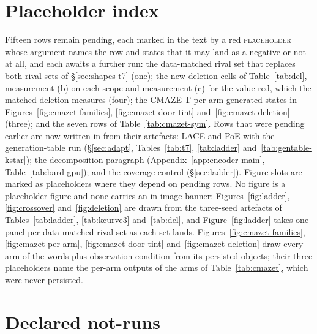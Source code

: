 \documentclass{article} %
\begin{document}
\section{Placeholder index}
\label{app:placeholders}

Fifteen rows remain pending, each marked in the text by a red \textsc{placeholder} whose argument names
the row and states that it may land as a negative or not at all, and each awaits a further run: the
data-matched rival set that replaces both rival sets of \S\ref{sec:shapes-t7} (one); the new
deletion cells of Table~\ref{tab:del}, measurement (b) on each scope and measurement (c) for the
value red, which the matched deletion measures (four); the
CMAZE-T per-arm generated states in Figures~\ref{fig:cmazet-families}, \ref{fig:cmazet-door-tint}
and~\ref{fig:cmazet-deletion} (three); and the seven rows of Table~\ref{tab:cmazet-sym}. Rows
that were pending earlier are now written in from their artefacts: LACE and PoE with the generation-table run
(\S\ref{sec:adapt}, Tables~\ref{tab:t7}, \ref{tab:ladder} and~\ref{tab:gentable-kstar});
the decomposition paragraph (Appendix~\ref{app:encoder-main}, Table~\ref{tab:bard-gpu}); and the
coverage control
(\S\ref{sec:ladder}). Figure slots are marked as placeholders where they depend on pending rows.
No figure is a placeholder figure and none carries an in-image banner: Figures~\ref{fig:ladder},
\ref{fig:crossover} and~\ref{fig:deletion} are drawn from the three-seed artefacts of
Tables~\ref{tab:ladder}, \ref{tab:kcurve3} and~\ref{tab:del}, and Figure~\ref{fig:ladder} takes one
panel per data-matched rival set as each set lands. Figures~\ref{fig:cmazet-families},
\ref{fig:cmazet-per-arm}, \ref{fig:cmazet-door-tint} and~\ref{fig:cmazet-deletion} draw every arm
of the words-plus-observation condition from its persisted objects; their three placeholders name
the per-arm outputs of the arms of Table~\ref{tab:cmazet}, which were never persisted.

\section{Declared not-runs}
\label{app:notrun}
\end{document}

